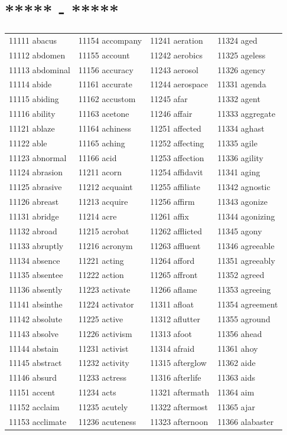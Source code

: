 \documentclass[10pt, oneside]{book}
\begin{document}
	\begin{table}
	    \centering
	    \section*{***** - *****}
	    \begin{tabular}{l l l l}
11111 abacus &11154 accompany &11241 aeration &11324 aged\\
11112 abdomen &11155 account &11242 aerobics &11325 ageless\\
11113 abdominal &11156 accuracy &11243 aerosol &11326 agency\\
11114 abide &11161 accurate &11244 aerospace &11331 agenda\\
11115 abiding &11162 accustom &11245 afar &11332 agent\\
11116 ability &11163 acetone &11246 affair &11333 aggregate\\
11121 ablaze &11164 achiness &11251 affected &11334 aghast\\
11122 able &11165 aching &11252 affecting &11335 agile\\
11123 abnormal &11166 acid &11253 affection &11336 agility\\
11124 abrasion &11211 acorn &11254 affidavit &11341 aging\\
11125 abrasive &11212 acquaint &11255 affiliate &11342 agnostic\\
11126 abreast &11213 acquire &11256 affirm &11343 agonize\\
11131 abridge &11214 acre &11261 affix &11344 agonizing\\
11132 abroad &11215 acrobat &11262 afflicted &11345 agony\\
11133 abruptly &11216 acronym &11263 affluent &11346 agreeable\\
11134 absence &11221 acting &11264 afford &11351 agreeably\\
11135 absentee &11222 action &11265 affront &11352 agreed\\
11136 absently &11223 activate &11266 aflame &11353 agreeing\\
11141 absinthe &11224 activator &11311 afloat &11354 agreement\\
11142 absolute &11225 active &11312 aflutter &11355 aground\\
11143 absolve &11226 activism &11313 afoot &11356 ahead\\
11144 abstain &11231 activist &11314 afraid &11361 ahoy\\
11145 abstract &11232 activity &11315 afterglow &11362 aide\\
11146 absurd &11233 actress &11316 afterlife &11363 aids\\
11151 accent &11234 acts &11321 aftermath &11364 aim\\
11152 acclaim &11235 acutely &11322 aftermost &11365 ajar\\
11153 acclimate &11236 acuteness &11323 afternoon &11366 alabaster\\
	\end{tabular}
 \end{table}
\end{document}
